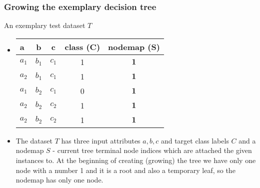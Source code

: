 \documentclass[smaller, proffesionalfonts]{beamer}
\def\bm{\boldsymbol}
\begin{document}
\begin{frame}
\frametitle{Growing the exemplary decision tree}
\begin{block}{An exemplary test dataset $T$}
\begin{itemize}
\item[\ ]
\begin{center}
{\sf
   \begin{tabular}{|p{3mm}||c|c||c||c|}
   \hline 
   a & b & c & class (C) & nodemap (S)\\
   \hline
   \hline
    $a_1$ & $b_1$ & $c_1$ & 1 & $\bm 1$ \\
   \hline
    $a_2$ & $b_1$ & $c_1$ & 1 & $\bm 1$ \\
   \hline
    $a_1$ & $b_2$ & $c_1$ & 0 & $\bm 1$ \\
   \hline
    $a_2$ & $b_2$ & $c_2$ & 1 & $\bm 1$ \\
   \hline
    $a_2$ & $b_2$ & $c_2$ & 1 & $\bm 1$ \\
   \hline
   \end{tabular}
}
\end{center}
\item
\justifying
The dataset $T$ has three input attributes $a,b,c$ and target class labels $C$ and a nodemap $S$ - current tree terminal node indices which are attached the given instances to.
At the beginning of creating (growing) the tree we have only one node with a number 1 and it is a root and also a temporary leaf, so the nodemap has only one node.

\begin{center}
\end{center}

\end{itemize}
\end{block}
\end{frame}
\end{document}
